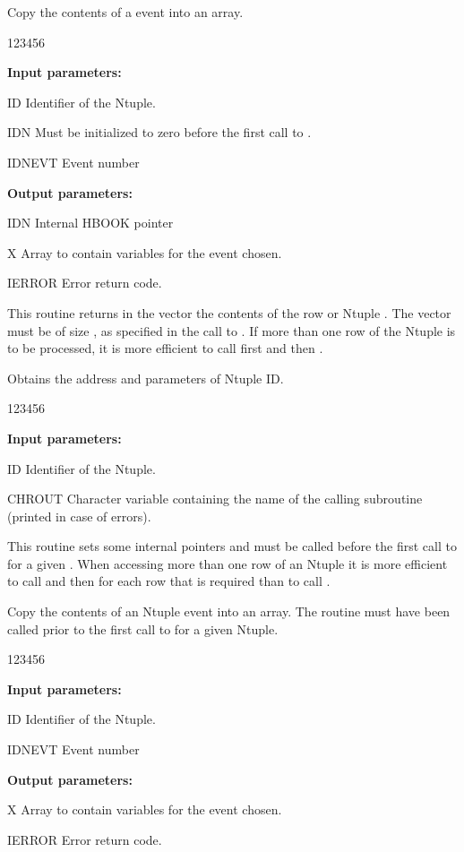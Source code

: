 \Action
Copy the contents of a \RWN{} event into an array.
 
\begin{DLtt}{123456}
\item[{\rm\bf Input parameters:}]
\item[ID]     Identifier of the Ntuple.
\item[IDN]    Must be initialized to zero before the first call to .
\item[IDNEVT] Event number
\item[{\rm\bf Output parameters:}]
\item[IDN]    Internal HBOOK pointer
\item[X]      Array to contain variables for the event chosen.
\item[IERROR] Error return code.
\end{DLtt}

This routine returns in the vector  the contents of the 
row  or Ntuple . 
The vector  must be of size ,
as specified in the call to .
If more than one row of the Ntuple is to be processed, it is more
efficient to call first  and then .


\Action
Obtains the address and parameters of Ntuple ID.
\begin{DLtt}{123456}
\item[{\rm\bf Input parameters:}]
\item[ID]Identifier of the Ntuple.
\item[CHROUT]Character variable containing the name of the calling
subroutine (printed in case of errors).
\end{DLtt}

This routine sets some internal pointers and must be called before
the first call to  for a given \RWN{}. When accessing
more than one row of an Ntuple it is more efficient to call
 and then  for each row that is required
than to call .

 
\Action
Copy the contents of an Ntuple event into an array.
The routine  must have been called
prior to the first call to  for a given
Ntuple.
 
\begin{DLtt}{123456}
\item[{\rm\bf Input parameters:}]
\item[ID]Identifier of the Ntuple.
\item[IDNEVT]Event number
\item[{\rm\bf Output parameters:}]
\item[X] Array to contain variables for the event chosen.
\item[IERROR] Error return code.
\end{DLtt}

